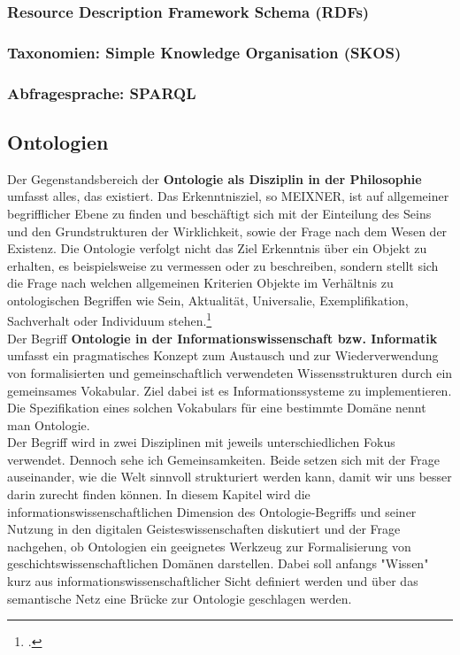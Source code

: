 \documentclass[12pt,a4paper]{article}
\begin{document}
\subsubsection{Resource Description Framework Schema (RDFs)}

\subsubsection{Taxonomien: Simple Knowledge Organisation (SKOS)}

\subsubsection{Abfragesprache: SPARQL}

\subsection{Ontologien}
Der Gegenstandsbereich der \textbf{Ontologie als Disziplin in der Philosophie} umfasst alles, das existiert. Das Erkenntnisziel, so MEIXNER, ist auf allgemeiner begrifflicher Ebene zu finden und beschäftigt sich mit der Einteilung des Seins und den Grundstrukturen der Wirklichkeit, sowie der Frage nach dem Wesen der Existenz. Die Ontologie verfolgt nicht das Ziel Erkenntnis über ein Objekt zu erhalten, es beispielsweise zu vermessen oder zu beschreiben, sondern stellt sich die Frage nach welchen allgemeinen Kriterien Objekte im Verhältnis zu ontologischen Begriffen wie Sein, Aktualität, Universalie, Exemplifikation, Sachverhalt oder Individuum stehen.\footcite{meixner1994wissenschaft}
\\
Der Begriff \textbf{Ontologie in der Informationswissenschaft bzw. Informatik} umfasst ein pragmatisches Konzept zum Austausch und zur Wiederverwendung von formalisierten und gemeinschaftlich verwendeten Wissensstrukturen durch ein gemeinsames Vokabular. Ziel dabei ist es Informationssysteme zu implementieren. Die Spezifikation eines solchen Vokabulars für eine bestimmte Domäne nennt man Ontologie.
\\
Der Begriff wird in zwei Disziplinen mit jeweils unterschiedlichen Fokus verwendet. Dennoch sehe ich Gemeinsamkeiten. Beide setzen sich mit der Frage auseinander, wie  die Welt sinnvoll strukturiert werden kann, damit wir uns besser darin zurecht finden können. In diesem Kapitel wird die informationswissenschaftlichen Dimension des Ontologie-Begriffs und seiner Nutzung in den digitalen Geisteswissenschaften diskutiert und der Frage nachgehen, ob Ontologien ein geeignetes Werkzeug zur Formalisierung von geschichtswissenschaftlichen Domänen darstellen. Dabei soll anfangs "Wissen" kurz aus informationswissenschaftlicher Sicht definiert werden und über das semantische Netz eine Brücke zur Ontologie geschlagen werden. 
\end{document}
